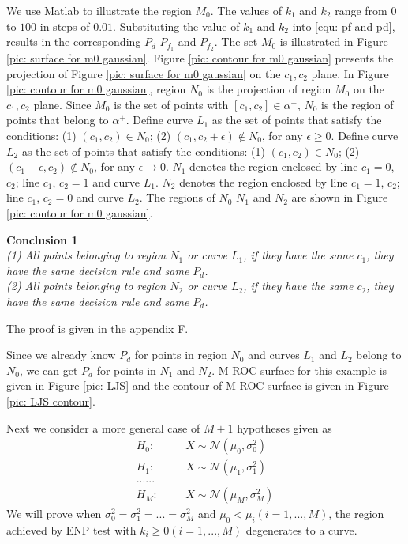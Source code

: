 \documentclass[12pt,journal,a4paper,twoside,onecolumn]{IEEEtran}
\begin{document}
\begin{spacing}{2.5}
We use Matlab to illustrate the region $M_0$. The values of $k_1$ and $k_2$ range from $0$ to $100$ in steps of $0.01$. Substituting the value of $k_1$ and $k_2$ into \eqref{equ: pf and pd}, results in the corresponding $P_d$ $P_{f_1}$ and $P_{f_2}$.  The set $M_0$ is illustrated in Figure \ref{pic: surface for m0 gaussian}. Figure \ref{pic: contour for m0 gaussian} presents the projection of Figure \ref{pic: surface for m0 gaussian} on the $c_1, c_2$ plane.
In Figure \ref{pic: contour for m0 gaussian}, region $N_0$ is the projection of region $M_0$ on the $c_1, c_2$ plane. Since $M_0$ is the set of points with $[c_1, c_2] \in \alpha^+$, $N_0$ is the region of points that belong to $\alpha^+$.
Define curve $L_1$ as the set of points that satisfy the conditions: (1) $(c_1, c_2) \in N_0$; (2) $(c_1, c_2+\epsilon) \notin N_0$, for any $\epsilon \geq 0$. Define curve $L_2$ as the set of points that satisfy the conditions: (1) $(c_1, c_2) \in N_0$; (2) $(c_1 + \epsilon, c_2) \notin N_0$, for any $\epsilon \rightarrow 0$.
$N_1$ denotes the region enclosed by line $c_1 = 0$, $c_2$; line $c_1$, $c_2 = 1$ and curve $L_1$.
$N_2$ denotes the region enclosed by line $c_1 = 1$, $c_2$; line $c_1$, $c_2 = 0$ and curve $L_2$.
The regions of $N_0$ $N_1$ and $N_2$ are shown in Figure \ref{pic: contour for m0 gaussian}.

\textbf{Conclusion 1}
\textit{\\(1) All points belonging to region $N_1$ or curve $L_1$, if they have the same $c_1$, they have the same decision rule and same $P_d$.
\\(2) All points belonging to region $N_2$ or curve $L_2$, if they have the same $c_2$, they have the same decision rule and same $P_d$.
}

The proof is given in the appendix F.

Since we already know $P_d$ for points in region $N_0$ and curves $L_1$ and $L_2$ belong to $N_0$, we can get $P_d$ for points in $N_1$ and $N_2$. M-ROC surface for this example is given in Figure  \ref{pic: LJS} and the contour of M-ROC surface is given in Figure \ref{pic: LJS contour}.

Next we consider a more general case of $M+1$ hypotheses given as
\begin{equation}
\label{equ: m+1 Gaussian Hypo}
\begin{split}
H_0:\;\;\;\;\;\;&X\sim \mathcal{N}(\mu_0, \sigma_0^2)\\
H_1:\;\;\;\;\;\;&X\sim \mathcal{N}(\mu_1, \sigma_1^2)\\
  ......\\
H_M:\;\;\;\;\;\;&X\sim \mathcal{N}(\mu_M, \sigma_M^2)
\end{split}
\end{equation}
We will prove when $\sigma_0^2 = \sigma_1^2 = ... = \sigma_M^2$ and $\mu_0 < \mu_i (i = 1, ..., M)$, the region achieved by ENP test with $k_i \geq 0 (i = 1, ..., M)$ degenerates to a curve.


\end{spacing}
\end{document}
